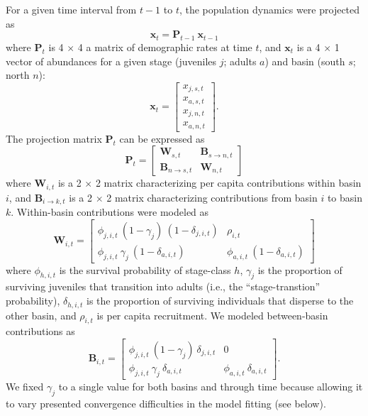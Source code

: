 \documentclass[11pt]{article}
\begin{document}
For a given time interval from $t-1$ to $t$, 
the population dynamics were projected as
%
\begin{equation} \label{eq:XPX}
    \mathbf{x}_t = \mathbf{P}_{t-1}~\mathbf{x}_{t-1}
\end{equation}
%
where $\mathbf{P}_{t}$ is 4 $\times$ 4 a matrix of demographic rates at time $t$, 
and $\mathbf{x}_{t}$ is a 4 $\times$ 1 vector of abundances 
for a given stage (juveniles $j$; adults $a$) 
and basin (south $s$; north $n$):
%
\begin{equation} \label{eq:X}
\mathbf{x}_{t} = 
\left[
\begin{array}{cccc}
    {x_{j,s,t}} \\
    {x_{a,s,t}} \\
    {x_{j,n,t}} \\
    {x_{a,n,t}}
    \end{array}
\right]
\text{.}
\end{equation}
%
The projection matrix $\mathbf{P}_{t}$ can be expressed as
%
\begin{equation} \label{eq:P}
\mathbf{P}_{t} = 
\left[
\begin{array}{c|ccc}
    \mathbf{W}_{s,t}  & \mathbf{B}_{s\rightarrow n,t} \\
    \hline
    \mathbf{B}_{n\rightarrow s,t} & \mathbf{W}_{n,t}
    \end{array}
\right]
\end{equation}
%
where $\mathbf{W}_{i,t}$ is a 2 $\times$ 2 matrix characterizing 
per capita contributions within basin $i$,
and $\mathbf{B}_{i\rightarrow k,t}$ is a 2 $\times$ 2 matrix characterizing 
contributions from basin $i$ to basin $k$.
Within-basin contributions were modeled as 
\begin{equation} \label{eq:W}
\mathbf{W}_{i,t} = 
\left[
\begin{array}{cccc}
    \phi_{j,i,t}~(1-\gamma_{j})~(1-\delta_{j,i,t}) & 
    \rho_{i,t} \\
    \phi_{j,i,t}~\gamma_{j}~(1-\delta_{a,i,t}) & 
    \phi_{a,i,t}~(1-\delta_{a,i,t})
    \end{array}
\right]
\end{equation}
%
where $\phi_{h,i,t}$ is the survival probability of stage-class $h$, 
$\gamma_{j}$ is the proportion of surviving juveniles that transition into adults
(i.e., the ``stage-transtion'' probability),
$\delta_{h,i,t}$ is the proportion of surviving individuals that disperse to the other basin,
and $\rho_{i,t}$ is per capita recruitment.
We modeled between-basin contributions as
%
\begin{equation} \label{eq:B}
\mathbf{B}_{i,t} = 
\left[
\begin{array}{cccc}
    \phi_{j,i,t}~(1 - \gamma_{j})~\delta_{j,i,t} & 
    0 \\
    
    \phi_{j,i,t}~\gamma_{j}~\delta_{a,i,t} & 
    \phi_{a,i,t}~\delta_{a,i,t}
    \end{array}
\right].
\end{equation}
%
We fixed $\gamma_{j}$ to a single value for both basins and through time 
because allowing it to vary presented convergence difficulties in the model fitting (see below).
\end{document}
